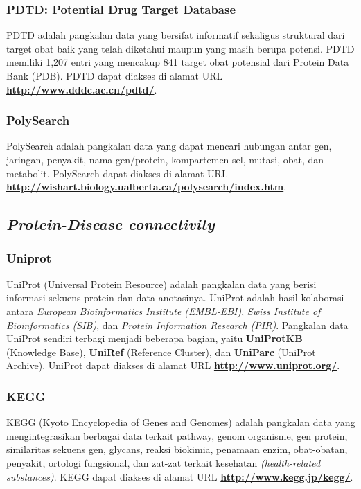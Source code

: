 		\subsubsection{PDTD: Potential Drug Target Database} \label{pdtd}
		PDTD adalah pangkalan data yang bersifat informatif sekaligus struktural dari target obat baik yang telah diketahui maupun yang masih berupa potensi. PDTD memiliki 1,207 entri yang mencakup 841 target obat potensial dari Protein Data Bank (PDB). PDTD dapat diakses di alamat URL \textbf{\url{http://www.dddc.ac.cn/pdtd/}}.

		\subsubsection{PolySearch} \label{polysearch}
		PolySearch adalah pangkalan data yang dapat mencari hubungan antar gen, jaringan, penyakit, nama gen/protein, kompartemen sel, mutasi, obat, dan metabolit. PolySearch dapat diakses di alamat URL \textbf{\url{http://wishart.biology.ualberta.ca/polysearch/index.htm}}.

	\subsection{\emph{Protein-Disease connectivity}}
		\subsubsection{Uniprot} \label{uniprot}
		UniProt (Universal Protein Resource) adalah pangkalan data yang berisi informasi sekuens protein dan data anotasinya. UniProt adalah hasil kolaborasi antara \emph{European Bioinformatics Institute (EMBL-EBI)}, \emph{Swiss Institute of Bioinformatics (SIB)}, dan \emph{Protein Information Research (PIR)}. Pangkalan data UniProt sendiri terbagi menjadi beberapa bagian, yaitu \textbf{UniProtKB} (Knowledge Base), \textbf{UniRef} (Reference Cluster), dan \textbf{UniParc} (UniProt Archive). UniProt dapat diakses di alamat URL \textbf{\url{http://www.uniprot.org/}}.

		\subsubsection{KEGG} \label{kegg}
		KEGG (Kyoto Encyclopedia of Genes and Genomes) adalah pangkalan data yang mengintegrasikan berbagai data terkait pathway, genom organisme, gen protein, similaritas sekuens gen, glycans, reaksi biokimia, penamaan enzim, obat-obatan, penyakit, ortologi fungsional, dan zat-zat terkait kesehatan \emph{(health-related substances)}. KEGG dapat diakses di alamat URL \textbf{\url{http://www.kegg.jp/kegg/}}.

